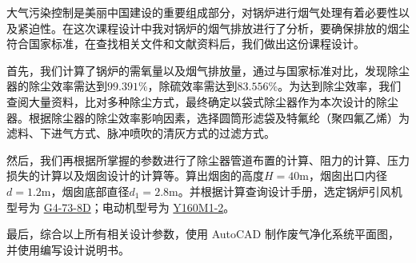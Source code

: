 \null   %

\begin{conclusion}
大气污染控制是美丽中国建设的重要组成部分，对锅炉进行烟气处理有着必要性以及紧迫性。在这次课程设计中我对锅炉的烟气排放进行了分析，要确保排放的烟尘符合国家标准，在查找相关文件和文献资料后，我们做出这份课程设计。

首先，我们计算了锅炉的需氧量以及烟气排放量，通过与国家标准对比，发现除尘器的除尘效率需达到$99.391\%$，除硫效率需达到$83.556\%$。为达到除尘效率，我们查阅大量资料，比对多种除尘方式，最终确定以袋式除尘器作为本次设计的除尘器。根据除尘器的除尘效率影响因素，选择圆筒形滤袋及特氟纶（聚四氟乙烯）为滤料、下进气方式、脉冲喷吹的清灰方式的过滤方式。
    
然后，我们再根据所掌握的参数进行了除尘器管道布置的计算、阻力的计算、压力损失的计算以及烟囱设计的计算等。算出烟囱的高度$H=40$m，烟囱出口内径$d=1.2$m，烟囱底部直径$d_1=2.8$m。并根据计算查询设计手册，选定锅炉引风机型号为 \hyperref[tab:The main performance parameters of the selected wind turbine]{G4-73-8D}；电动机型号为 \hyperref[tab:Y160M1-2 Motor model parameter table]{Y160M1-2}。

最后，综合以上所有相关设计参数，使用 AutoCAD 制作废气净化系统平面图，并使用\XeLaTeX 编写设计说明书。

\end{conclusion}
